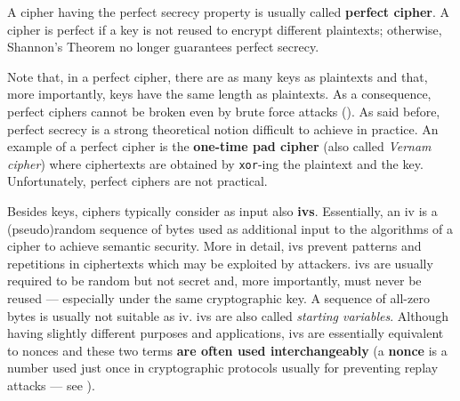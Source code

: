 A cipher having the perfect secrecy property is usually called \textbf{perfect cipher}. A cipher is perfect if a key is not reused to encrypt different plaintexts; otherwise, Shannon's Theorem no longer guarantees perfect secrecy. 


Note that, in a perfect cipher, there are as many keys as plaintexts and that, more importantly, keys have the same length as plaintexts. As a consequence, perfect ciphers cannot be broken even by brute force attacks (). As said before, perfect secrecy is a strong theoretical notion difficult to achieve in practice. An example of a perfect cipher is the \textbf{one-time pad cipher} (also called \textit{Vernam cipher}) where ciphertexts are obtained by \texttt{xor}-ing the plaintext and the key. Unfortunately, perfect ciphers are not practical.

Besides keys, ciphers typically consider as input also \textbf{\glspl{iv}}. Essentially, an \gls{iv} is a (pseudo)random
sequence of bytes used as additional input to the algorithms of a cipher to achieve semantic security. More in detail, \glspl{iv} prevent patterns and repetitions in ciphertexts which may be exploited by attackers. \glspl{iv} are usually required to be random but not secret and, more importantly, must never be reused --- especially under the same cryptographic key. A sequence of all-zero bytes is usually not suitable as \gls{iv}. \glspl{iv} are also called \textit{starting variables}. Although having slightly different purposes and applications, \glspl{iv} are essentially equivalent to nonces and these two terms \textbf{are often used interchangeably} (a \textbf{nonce} is a number used just once in cryptographic protocols usually for preventing replay attacks --- see ).

